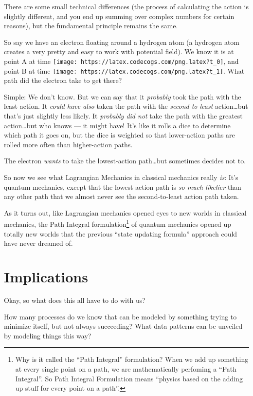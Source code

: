 \documentclass[]{article}
\begin{document}
There are some small technical differences (the process of calculating the
action is slightly different, and you end up summing over complex numbers for
certain reasons), but the fundamental principle remains the same.

So say we have an electron floating around a hydrogen atom (a hydrogen atom
creates a very pretty and easy to work with potential field). We know it is at
point A at time \texttt{[image: https://latex.codecogs.com/png.latex?t\_0]}, and
point B at time \texttt{[image: https://latex.codecogs.com/png.latex?t\_1]}. What
path did the electron take to get there?

Simple: We don't know. But we can say that it \emph{probably} took the path with
the least action. It \emph{could have also} taken the path with the \emph{second
to least} action\ldots{}but that's just slightly less likely. It \emph{probably
did not} take the path with the greatest action\ldots{}but who knows --- it
might have! It's like it rolls a dice to determine which path it goes on, but
the dice is weighted so that lower-action paths are rolled more often than
higher-action paths.

The electron \emph{wants} to take the lowest-action path\ldots{}but sometimes
decides not to.

So now we see what Lagrangian Mechanics in classical mechanics really \emph{is}:
It's quantum mechanics, except that the lowest-action path is \emph{so much
likelier} than any other path that we almost never see the second-to-least
action path taken.

As it turns out, like Lagrangian mechanics opened eyes to new worlds in
classical mechanics, the Path Integral formulation\footnote{Why is it called the
  ``Path Integral'' formulation? When we add up something at every single point
  on a path, we are mathematically perfoming a ``Path Integral''. So Path
  Integral Formulation means ``physics based on the adding up stuff for every
  point on a path''.} of quantum mechanics opened up totally new worlds that the
previous ``state updating formula'' approach could have never dreamed of.

\section{Implications}\label{implications}

Okay, so what does this all have to do with us?

How many processes do we know that can be modeled by something trying to
minimize itself, but not always succeeding? What data patterns can be unveiled
by modeling things this way?
\end{document}
